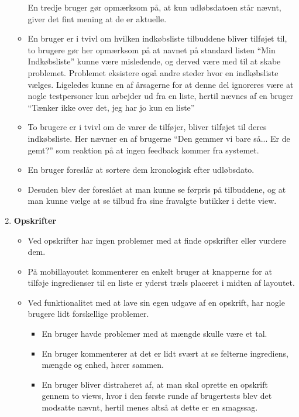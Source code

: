 \begin{enumerate}
\begin{itemize}
      En tredje bruger gør opmærksom på, at kun udløbsdatoen står nævnt, giver det fint mening at de er aktuelle.
      \item En bruger er i tvivl om hvilken indkøbsliste tilbuddene bliver tilføjet til, to brugere gør her opmærksom på at navnet på standard listen ``Min Indkøbsliste'' kunne være misledende, og derved være med til at skabe problemet.
      Problemet eksistere også andre steder hvor en indkøbsliste vælges.
      Ligeledes kunne en af årsagerne for at denne del ignoreres være at nogle testpersoner kun arbejder ud fra en liste, hertil nævnes af en bruger ``Tænker ikke over det, jeg har jo kun en liste''
      \item To brugere er i tvivl om de varer de tilføjer, bliver tilføjet til deres indkøbsliste.
      Her nævner en af brugerne ``Den gemmer vi bare så... Er de gemt?'' som reaktion på at ingen feedback kommer fra systemet.
      \item En bruger foreslår at sortere dem kronologisk efter udløbsdato.
      \item Desuden blev der foreslået at man kunne se førpris på tilbuddene, og at man kunne vælge at se tilbud fra sine fravalgte butikker i dette view.
   \end{itemize}
   \item \textbf{Opskrifter}
   \begin{itemize}
      \item Ved opskrifter har ingen problemer med at finde opskrifter eller vurdere dem.
      \item På mobillayoutet kommenterer en enkelt bruger at knapperne for at tilføje ingredienser til en liste er yderst træls placeret i midten af layoutet.
      \item Ved funktionalitet med at lave sin egen udgave af en opskrift, har nogle brugere lidt forskellige problemer.
      \begin{itemize}
         \item En bruger havde problemer med at mængde skulle være et tal.
         \item En bruger kommenterer at det er lidt svært at se felterne ingrediens, mængde og enhed, hører sammen.
         \item En bruger bliver distraheret af, at man skal oprette en opskrift gennem to views, hvor i den første runde af brugertests blev det modsatte nævnt, hertil menes altså at dette er en smagssag.
      \end{itemize} 
   \end{itemize}

\end{enumerate}
